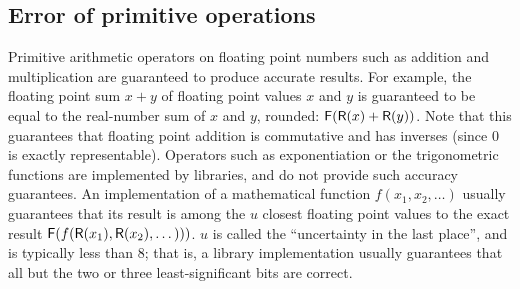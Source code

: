 \documentclass[paper.tex]{subfiles}
\begin{document}

\subsection{Error of primitive operations}

Primitive arithmetic operators on floating point numbers such as
addition and multiplication are guaranteed to produce accurate
results.  For example, the floating point sum $x + y$ of floating
point values $x$ and $y$ is guaranteed to be equal to the real-number
sum of $x$ and $y$, rounded: $\mathsf{F}(\mathsf{R}(x) + \mathsf{R}(y))$.  Note that this
guarantees that floating point addition is commutative and has
inverses (since $0$ is exactly representable).  Operators such as
exponentiation or the trigonometric functions are implemented by
libraries, and do not provide such accuracy guarantees.  An
implementation of a mathematical function $f(x_1, x_2, \dotsc)$
usually guarantees that its result is among the $u$ closest floating
point values to the exact result $\mathsf{F}(f(\mathsf{R}(x_1), \mathsf{R}(x_2), \dotsc)))$.
$u$ is called the ``uncertainty in the last place'', and is typically
less than 8; that is, a library implementation usually guarantees that
all but the two or three least-significant bits are correct.
\end{document}
